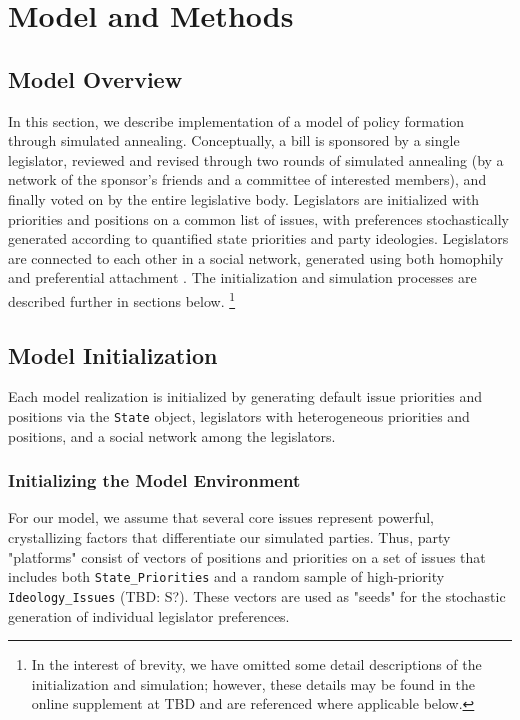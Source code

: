 \documentclass[pdftex,12pt]{llncs}
\begin{document}
\section{Model and Methods}
\subsection{Model Overview}
In this section, we describe implementation of a model of policy formation through simulated annealing.
Conceptually, a bill is sponsored by a single legislator, reviewed and revised through two rounds of simulated annealing (by a network of the sponsor's friends and a committee of interested members), and finally voted on by the entire legislative body.
Legislators are initialized with priorities and positions on a common list of issues, with preferences stochastically generated according to quantified state priorities and party ideologies.
Legislators are connected to each other in a social network, generated using both homophily \parencite{msc01, br11} and preferential attachment \parencite{Barabasi1999}.
The initialization and simulation processes are described further in sections below.
\footnote{In the interest of brevity, we have omitted some detail descriptions of the initialization and simulation; however, these details may be found in the online supplement at TBD and are referenced where applicable below.}
\subsection{Model Initialization}
Each model realization is initialized by generating default issue priorities and positions via the \texttt{State} object, legislators with heterogeneous priorities and positions, and a social network among the legislators.
\subsubsection{Initializing the Model Environment}
For our model, we assume that several core issues represent powerful, crystallizing factors that differentiate our simulated parties.
Thus, party "platforms" consist of vectors of positions and priorities on a set of issues that includes both \texttt{State\_Priorities} and a random sample of high-priority \texttt{Ideology\_Issues} (TBD: S?).
These vectors are used as "seeds" for the stochastic generation of individual legislator preferences.
\end{document}
